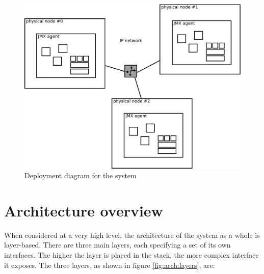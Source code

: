 \documentclass[11pt]{book}
\begin{document}
      \begin{figure}[H]
        \begin{center}
          \includegraphics[width=.8\textwidth]{img/architecture/deployment.pdf}
        \end{center}

        \caption{Deployment diagram for the system}
        \label{fig:arch:deployment}
      \end{figure}


    \section{Architecture overview}
    \label{sec:arch:over}

      When considered at a very high level, the architecture of the system as a whole is layer-based. There are three
      main layers, each specifying a set of its own interfaces. The higher the layer is placed in the stack, the more
      complex interface it exposes. The three layers, as shown in figure \ref{fig:arch:layers}, are:
\end{document}
